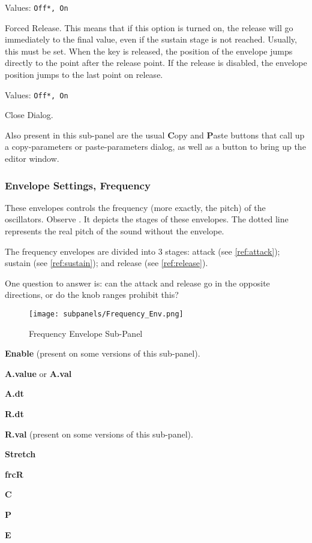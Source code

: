    Values: \texttt{Off*, On}

   Forced Release.
   This means that if this option is turned on, the release will go
   immediately to the final value, even if the sustain stage is not reached.
   Usually, this must be set.
   When the key is released, the position of the envelope jumps directly to
   the point after the release point. If the release is disabled, the
   envelope position jumps to the last point on release.

   Values: \texttt{Off*, On}

   Close Dialog.

   Also present in this sub-panel are the usual \textbf{C}opy
   and \textbf{P}aste buttons that call up a copy-parameters or
   paste-parameters dialog, as well as a button
   to bring up the editor window.

\subsubsection{Envelope Settings, Frequency}
\label{subsubsec:envelope_settings_for_frequency}

   These envelopes controls the frequency (more exactly, the pitch) of the
   oscillators.
   Observe .
   It depicts the stages of these envelopes.
   The dotted line represents the real pitch of the sound without the envelope.

   The frequency envelopes are divided into 3 stages:
   attack (see \ref{ref:attack});
   sustain (see \ref{ref:sustain});
   and
   release (see \ref{ref:release}).

   One question to answer is:  
   can the attack and release go in the opposite directions, or do the knob
   ranges prohibit this?

\begin{figure}[H]
   \centering 
   \texttt{[image: subpanels/Frequency\_Env.png]}
   \caption[Frequency Envelope Sub-Panel]{Frequency Envelope Sub-Panel}
   \label{fig:frequency_env}
\end{figure}

   \begin{enumber}
      \item \textbf{Enable} (present on some versions of this sub-panel).
      \item \textbf{A.value} or \textbf{A.val}
      \item \textbf{A.dt}
      \item \textbf{R.dt}
      \item \textbf{R.val} (present on some versions of this sub-panel).
      \item \textbf{Stretch}
      \item \textbf{frcR}
      \item \textbf{C}
      \item \textbf{P}
      \item \textbf{E}
   \end{enumber}

